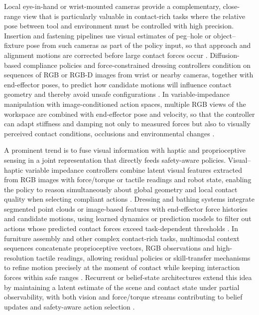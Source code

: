 \documentclass[Afour,sageh,times]{template/sagej}
\begin{document}
Local eye-in-hand or wrist-mounted cameras provide a complementary, close-range view that is particularly valuable in contact-rich tasks where the relative pose between tool and environment must be controlled with high precision. Insertion and fastening pipelines use visual estimates of peg–hole or object–fixture pose from such cameras as part of the policy input, so that approach and alignment motions are corrected before large contact forces occur \citep{3,28,85,87}. Diffusion-based compliance policies and force-constrained dressing controllers condition on sequences of RGB or RGB-D images from wrist or nearby cameras, together with end-effector poses, to predict how candidate motions will influence contact geometry and thereby avoid unsafe configurations \citep{6,9,12}. In variable-impedance manipulation with image-conditioned action spaces, multiple RGB views of the workspace are combined with end-effector pose and velocity, so that the controller can adapt stiffness and damping not only to measured forces but also to visually perceived contact conditions, occlusions and environmental changes \citep{89,100,107}.

A prominent trend is to fuse visual information with haptic and proprioceptive sensing in a joint representation that directly feeds safety-aware policies. Visual–haptic variable impedance controllers combine latent visual features extracted from RGB images with force/torque or tactile readings and robot state, enabling the policy to reason simultaneously about global geometry and local contact quality when selecting compliant actions \citep{31,86}. Dressing and bathing systems integrate segmented point clouds or image-based features with end-effector force histories and candidate motions, using learned dynamics or prediction models to filter out actions whose predicted contact forces exceed task-dependent thresholds \citep{5,9,12}. In furniture assembly and other complex contact-rich tasks, multimodal context sequences concatenate proprioceptive vectors, RGB observations and high-resolution tactile readings, allowing residual policies or skill-transfer mechanisms to refine motion precisely at the moment of contact while keeping interaction forces within safe ranges \citep{38,43,82}. Recurrent or belief-state architectures extend this idea by maintaining a latent estimate of the scene and contact state under partial observability, with both vision and force/torque streams contributing to belief updates and safety-aware action selection \citep{94,100}.
\end{document}
